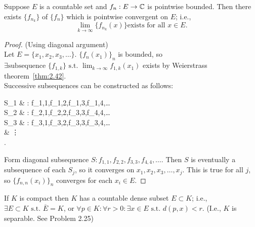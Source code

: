 \begin{thm}
	Suppose $E$ is a countable set and $f_{n}:E\to \mathbb{C}$ is pointwise bounded.
	Then there exists $\{f_{n_k}\}$ of $\{ {f}_{n}\} $ which is pointwise convergent on $E$; i.e., \[
		\lim_{k\to \infty}{\{ {f}_{n_{k}}(x)\}} \text{exists for all } x \in E
		.\]
	\begin{proof}
		(Using diagonal argument)\\
		Let $E=\{x_1,x_2,x_3,\ldots \}$.
		$\{{f}_{n}(x_1)\}_{n}$ is bounded, so $\exists{\text{subsequence }\{f_{1,k}\}} \text{ s.t. } \lim_{k\to \infty}{f_{1,k}(x_1)}$ exists by Weierstrass theorem~\ref{thm:2.42}.\\
		Successive subsequences can be constructed as follows:\\
		\begin{flalign*}
			S_1 & : f_{1,1},f_{1,2},f_{1,3},f_{1,4},\ldots {}          \\
			S_2 & : f_{2,1},f_{2,2},f_{3,3},f_{4,4},\ldots {}     \\
			S_3 & : f_{3,1},f_{3,2},f_{3,3},f_{3,4},\ldots {} \\
			    & \vdots                                                                       \\.
		\end{flalign*}
		Form diagonal subsequence $S: f_{1,1}, f_{2,2}, f_{3,3}, f_{4,4}, \ldots $.
		Then $S$ is eventually a subsequence of each $S_j$, so it converges on $x_1,x_2,x_3,\ldots ,x_j$. This is true for all $j$, so $\{f_{n,n}(x_i)\}_n $ converges for each $x_{i} \in E$.
	\end{proof}
\end{thm}

\begin{lemma}
	If $K$ is compact then $K$ has a countable dense subset $E \subset K$; i.e., $\exists{E \subset  K} \text{ s.t. } \overline{E}=K$, or $\forall{p \in K}: \forall{r>0}: \exists{x\in E} \text{ s.t. } d(p,x)<r$.
	(I.e., $K$ is separable. See Problem 2.25)
\end{lemma}

